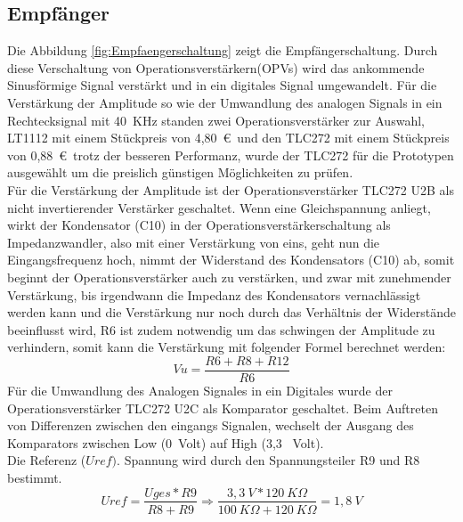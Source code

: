 \subsection{Empfänger}
Die Abbildung \ref{fig:Empfaengerschaltung} zeigt die Empfängerschaltung. Durch diese Verschaltung von Operationsverstärkern(OPVs) wird das ankommende Sinusförmige Signal verstärkt und in ein digitales Signal umgewandelt. 
Für die Verstärkung der Amplitude so wie der Umwandlung des analogen Signals in ein Rechtecksignal mit 40~KHz standen zwei Operationsverstärker zur Auswahl, LT1112 mit einem Stückpreis von 4,80~\euro\ und den TLC272 mit einem Stückpreis von 0,88~\euro\ trotz der besseren Performanz, wurde der TLC272 für die Prototypen ausgewählt um die preislich günstigen Möglichkeiten zu prüfen.\\%
Für die Verstärkung der Amplitude ist der Operationsverstärker TLC272 U2B als nicht invertierender Verstärker geschaltet.
Wenn eine Gleichspannung anliegt, wirkt der Kondensator (C10) in der Operationsverstärkerschaltung als Impedanzwandler, also mit einer Verstärkung von eins, geht nun die Eingangsfrequenz hoch, nimmt der Widerstand des Kondensators (C10) ab, somit beginnt der Operationsverstärker auch zu verstärken, und zwar mit zunehmender Verstärkung, bis irgendwann die Impedanz des Kondensators vernachlässigt werden kann und die Verstärkung nur noch durch das Verhältnis der Widerstände beeinflusst wird, R6 ist zudem notwendig um das schwingen der Amplitude zu verhindern, somit kann die Verstärkung mit folgender Formel berechnet werden:
\onehalfspacing \\
\[\displaystyle Vu= \frac{ R6+R8+R12}{R6} \]
\singlespacing
Für die Umwandlung des Analogen Signales in ein Digitales wurde der Operationsverstärker TLC272 U2C als Komparator geschaltet. Beim Auftreten von Differenzen zwischen den eingangs Signalen, wechselt der Ausgang des Komparators zwischen Low (0~Volt) auf High (3,3~ Volt).\\ Die Referenz (\(\displaystyle Uref).\) Spannung wird durch den Spannungsteiler R9 und R8 bestimmt.
\onehalfspacing \\
\[\displaystyle Uref=\frac{Uges*R9}{R8+R9}\Rightarrow\frac{3,3~V*120~K\Omega}{100~K\Omega+120~K\Omega}=1,8~V \]
\singlespacing
